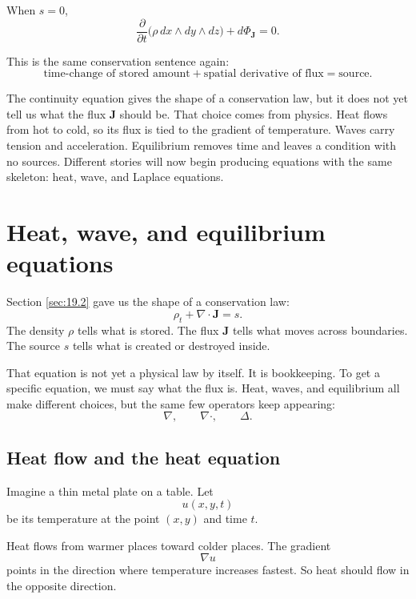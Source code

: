 When \(s=0\),
\[
\boxed{
    \frac{\partial}{\partial t}
    \bigl(\rho\,dx\wedge dy\wedge dz\bigr)
    +
    d\Phi_{\mathbf J}
    =
    0.
}
\]

This is the same conservation sentence again:
\[
\boxed{
    \text{time-change of stored amount}
    +
    \text{spatial derivative of flux}
    =
    \text{source}.
}
\]

The continuity equation gives the shape of a conservation law, but it does not yet tell
us what the flux \(\mathbf J\) should be.  That choice comes from physics.  Heat flows
from hot to cold, so its flux is tied to the gradient of temperature.  Waves carry
tension and acceleration.  Equilibrium removes time and leaves a condition with no
sources.  Different stories will now begin producing equations with the same skeleton:
heat, wave, and Laplace equations.

\section{Heat, wave, and equilibrium equations}
\label{sec:19.3}

Section \ref{sec:19.2} gave us the shape of a conservation law:
\[
    \rho_t+\nabla\cdot\mathbf J=s.
\]
The density \(\rho\) tells what is stored.  The flux \(\mathbf J\) tells what moves
across boundaries.  The source \(s\) tells what is created or destroyed inside.

That equation is not yet a physical law by itself.  It is bookkeeping.  To get a
specific equation, we must say what the flux is.  Heat, waves, and equilibrium all make
different choices, but the same few operators keep appearing:
\[
    \nabla,\qquad \nabla\cdot,\qquad \Delta.
\]

\subsection{Heat flow and the heat equation}

Imagine a thin metal plate on a table.  Let
\[
    u(x,y,t)
\]
be its temperature at the point \((x,y)\) and time \(t\).

Heat flows from warmer places toward colder places.  The gradient
\[
    \nabla u
\]
points in the direction where temperature increases fastest.  So heat should flow in the
opposite direction.

